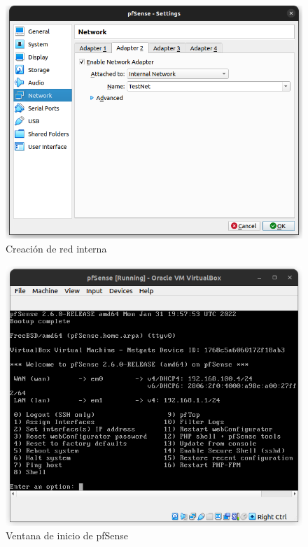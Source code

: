 \documentclass{article}
\begin{document}
        \begin{figure}[!htbp]
            \centering
            \includegraphics[scale=0.3]{img/pfsense-internal.png}
            \caption{Creación de red interna}
            \label{fig:pfsense-internal}
        \end{figure}

        \begin{figure}[!htbp]
            \centering
            \includegraphics[scale=0.3]{img/pfsense-init.png}
            \caption{Ventana de inicio de pfSense}
            \label{fig:pfsense-init}
        \end{figure}
\end{document}

